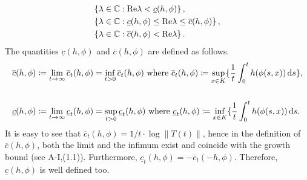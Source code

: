 \begin{equation}\label{eq:b3-4.3}
	\begin{aligned}
		&\{\lambda \in \mathbb{C} : \mathop{}\!\mathrm{Re}\lambda < \underline{c}(h,\phi)\}\,, \\
		&\{\lambda \in \mathbb{C} : \underline{c}(h,\phi) \leq \mathop{}\!\mathrm{Re}\lambda \leq \overline{c}(h,\phi)\}\,, \\
		&\{\lambda \in \mathbb{C} : \overline{c}(h,\phi) < \mathop{}\!\mathrm{Re}\lambda\}\,.
	\end{aligned}
\end{equation}
The quantities $\underline{c}(h,\phi)$ and $\overline{c}(h,\phi)$ are defined as follows.
\begin{align}\label{eq:b3-4.4}
		&\overline{c}(h,\phi) \coloneq \lim_{t\to\infty} \overline{c}_{t}(h,\phi) = \inf_{t>0} \overline{c}_{t}(h,\phi) \text{ where } 
		\overline{c}_{t}(h,\phi) \coloneq \sup_{x\in K} \{\frac{1}{t}\int_{0}^{t} h(\phi(s,x)) \mathop{}\!\mathrm{d}{s} \},\notag
        \\& \\ \notag
		&\underline{c}(h,\phi) \coloneq \lim_{t\to\infty} \underline{c}_{t}(h,\phi) = \sup_{t>0} \underline{c}_{t}(h,\phi) \text{ where } 
		\underline{c}_{t}(h,\phi) \coloneq \inf_{x\in K} \{\frac{1}{t}\int_{0}^{t} h(\phi(s,x)) \mathop{}\!\mathrm{d}{s}.
\end{align}
It is easy to see that $\overline{c}_{t}(h,\phi) = 1/t\cdot\log\|T(t)\|$, hence in the definition of $\overline{c}(h,\phi)$, both the limit and the infimum exist and coincide with the growth bound (see A-I,(1.1)).
Furthermore, $\underline{c}_{t}(h,\phi) = -\overline{c}_{t}(-h,\phi)$.
Therefore, $\underline{c}(h,\phi)$ is well defined too.


